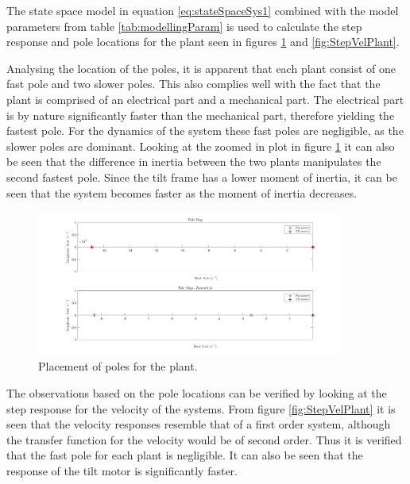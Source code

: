 \documentclass[../../main.tex]{subfiles}
\begin{document}
The state space model in equation \ref{eq:stateSpaceSys1} combined with the model parameters from table \ref{tab:modellingParam} is used to calculate the step response and pole locations for the plant seen in figures \ref{fig:polesPlant} and \ref{fig:StepVelPlant}.

Analysing the location of the poles, it is apparent that each plant consist of one fast pole and two slower poles. This also complies well with the fact that the plant is comprised of an electrical part and a mechanical part. The electrical part is by nature significantly faster than the mechanical part, therefore yielding the fastest pole. For the dynamics of the system these fast poles are negligible, as the slower poles are dominant. Looking at the zoomed in plot in figure \ref{fig:polesPlant} it can also be seen that the difference in inertia between the two plants manipulates the second fastest pole. Since the tilt frame has a lower moment of inertia, it can be seen that the system becomes faster as the moment of inertia decreases.

\begin{figure}
    \centering
    \includegraphics[width = 0.9\textwidth]{Sections/System_Modelling/Images/polesPlant.png}
    \caption{Placement of poles for the plant.}
    \label{fig:polesPlant}
\end{figure}

The observations based on the pole locations can be verified by looking at the step response for the velocity of the systems. From figure \ref{fig:StepVelPlant} it is seen that the velocity responses resemble that of a first order system, although the transfer function for the velocity would be of second order. Thus it is verified that the fast pole for each plant is negligible. It can also be seen that the response of the tilt motor is significantly faster.
 
\end{document}
